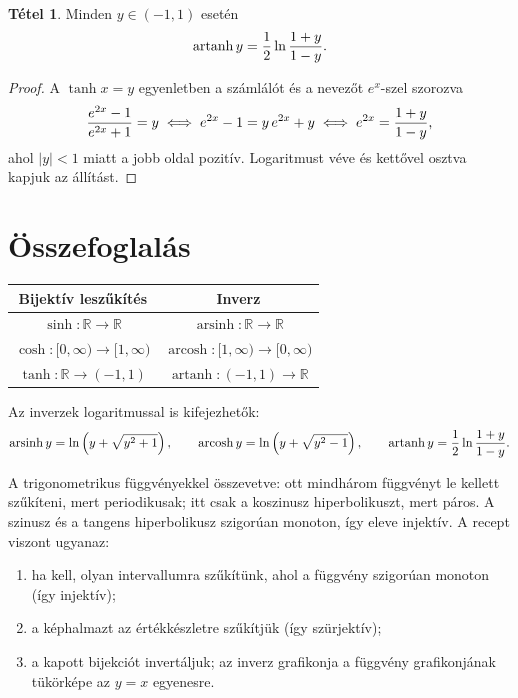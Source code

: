 \documentclass[11pt]{scrartcl}
\DeclareMathOperator{\arsinh}{arsinh}
\DeclareMathOperator{\arcosh}{arcosh}
\DeclareMathOperator{\artanh}{artanh}
\theoremstyle{definition}
\newtheorem{theorem}[definition]{Tétel}
\theoremstyle{remark}
\begin{document}
\begin{theorem}
	Minden $y \in (-1, 1)$ esetén
	\[
		\artanh y = \frac{1}{2} \ln\frac{1 + y}{1 - y}\text.
	\]
\end{theorem}

\begin{proof}
	A $\tanh x = y$ egyenletben a számlálót és a nevezőt $e^x$-szel szorozva
	\[
		\frac{e^{2x} - 1}{e^{2x} + 1} = y
		\iff e^{2x} - 1 = y\,e^{2x} + y
		\iff e^{2x} = \frac{1 + y}{1 - y}\text,
	\]
	ahol $|y| < 1$ miatt a jobb oldal pozitív. Logaritmust véve és kettővel
	osztva kapjuk az állítást.
\end{proof}

\section{Összefoglalás}

\begin{center}
	\renewcommand{\arraystretch}{1.7}
	\begin{tabular}{@{}cc@{}}
		\toprule
		Bijektív leszűkítés                       & Inverz \\
		\midrule
		$\sinh\colon \mathbb{R} \to \mathbb{R}$   &
		$\arsinh\colon \mathbb{R} \to \mathbb{R}$          \\
		$\cosh\colon [0, \infty) \to [1, \infty)$ &
		$\arcosh\colon [1, \infty) \to [0, \infty)$        \\
		$\tanh\colon \mathbb{R} \to (-1, 1)$      &
		$\artanh\colon (-1, 1) \to \mathbb{R}$             \\
		\bottomrule
	\end{tabular}
\end{center}

Az inverzek logaritmussal is kifejezhetők:
\[
	\arsinh y = \ln\left(y + \sqrt{y^2 + 1}\right), \qquad
	\arcosh y = \ln\left(y + \sqrt{y^2 - 1}\right), \qquad
	\artanh y = \frac{1}{2} \ln\frac{1 + y}{1 - y}\text.
\]

A trigonometrikus függvényekkel összevetve: ott mindhárom függvényt le
kellett szűkíteni, mert periodikusak; itt csak a koszinusz hiperbolikuszt,
mert páros. A szinusz és a tangens hiperbolikusz szigorúan monoton, így
eleve injektív. A recept viszont ugyanaz:
\begin{enumerate}
	\item ha kell, olyan intervallumra szűkítünk, ahol a függvény szigorúan
	      monoton (így injektív);
	\item a képhalmazt az értékkészletre szűkítjük (így szürjektív);
	\item a kapott bijekciót invertáljuk; az inverz grafikonja a függvény
	      grafikonjának tükörképe az $y = x$ egyenesre.
\end{enumerate}
\end{document}
